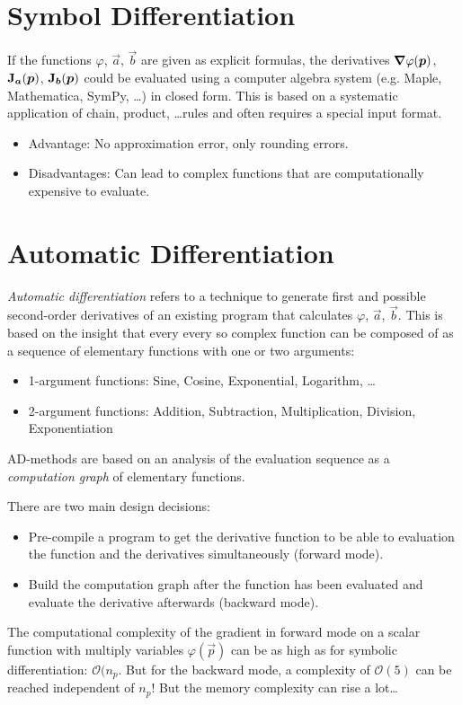 	\section{Symbol Differentiation}
		If the functions \( \varphi \), \( \vec{a} \), \( \vec{b} \) are given as explicit formulas, the derivatives \( \grad{\varphi}(\bm{p}) \), \( \bm{\mathrm{J}}_{\bm{a}}(\bm{p}) \), \( \bm{\mathrm{J}}_{\bm{b}}(\bm{p}) \) could be evaluated using a computer algebra system (e.g. Maple, Mathematica, SymPy, \dots) in closed form. This is based on a systematic application of chain, product, \dots rules and often requires a special input format.
		\begin{itemize}
			\item Advantage: No approximation error, only rounding errors.
			\item Disadvantages: Can lead to complex functions that are computationally expensive to evaluate.
		\end{itemize}

	\section{Automatic Differentiation}
		\emph{Automatic differentiation} refers to a technique to generate first and possible second-order derivatives of an existing program that calculates \(\varphi\), \(\vec{a}\), \(\vec{b}\). This is based on the insight that every every so complex function can be composed of as a sequence of elementary functions with one or two arguments:
		\begin{itemize}
			\item 1-argument functions: Sine, Cosine, Exponential, Logarithm, \dots
			\item 2-argument functions: Addition, Subtraction, Multiplication, Division, Exponentiation
		\end{itemize}
		AD-methods are based on an analysis of the evaluation sequence as a \emph{computation graph} of elementary functions.

		There are two main design decisions:
		\begin{itemize}
			\item Pre-compile a program to get the derivative function to be able to evaluation the function and the derivatives simultaneously (forward mode).
			\item Build the computation graph after the function has been evaluated and evaluate the derivative afterwards (backward mode).
		\end{itemize}
		The computational complexity of the gradient in forward mode on a scalar function with multiply variables \(\varphi(\vec{p})\) can be as high as for symbolic differentiation: \( \mathcal{O}(n_p \). But for the backward mode, a complexity of \( \mathcal{O}(5) \) can be reached independent of \( n_p \)! But the memory complexity can rise a lot\dots

